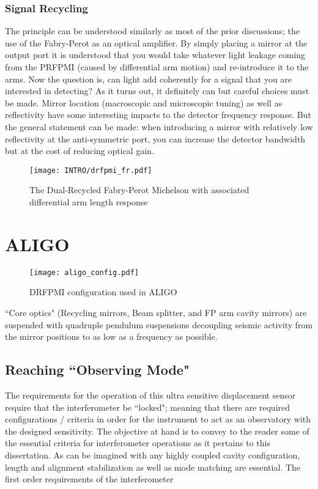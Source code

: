 \subsubsection{Signal Recycling}
The principle can be understood similarly as most of the prior discussions; the use of the Fabry-Perot as an optical amplifier. By simply placing a mirror at the output port it is understood that you would take whatever light leakage coming from the PRFPMI (caused by differential arm motion) and re-introduce it to the arms. Now the question is, can light add coherently for a signal that you are interested in detecting? As it turns out, it definitely can but careful choices must be made. Mirror location (macroscopic and microscopic tuning) as well as reflectivity have some interesting impacts to the detector frequency response. But the general statement can be made: when introducing a mirror with relatively low reflectivity at the anti-symmetric port, you can increase the detector bandwidth but at the cost of reducing optical gain.

\begin{figure}[H]
\begin{center}
\texttt{[image: INTRO/drfpmi\_fr.pdf]}
\end{center}
\caption{The Dual-Recycled Fabry-Perot Michelson with associated differential arm length response}
\label{fig:drfp_michelson}
\end{figure}


\section{ALIGO}

\begin{figure}[H]
  \begin{center}
	  \texttt{[image: aligo\_config.pdf]}
  \end{center}
  \caption{DRFPMI configuration used in ALIGO}
  \label{fig:simple_michelson}
\end{figure}

``Core optics" (Recycling mirrors, Beam splitter, and FP arm cavity mirrors) are suspended with quadruple pendulum suspensions decoupling seismic activity from the mirror positions to as low as a frequency as possible. 

\subsection{Reaching ``Observing Mode"}
The requirements for the operation of this ultra sensitive displacement sensor require that the interferometer be  ``locked"; meaning that there are required configurations / criteria in order for the instrument to act as an observatory with the designed sensitivity. The objective at hand is to convey to the reader some of the essential criteria for interferometer operations as it pertains to this dissertation. As can be imagined with any highly coupled cavity configuration, length and alignment stabilization as well as mode matching are essential. The first order requirements of the interferometer

